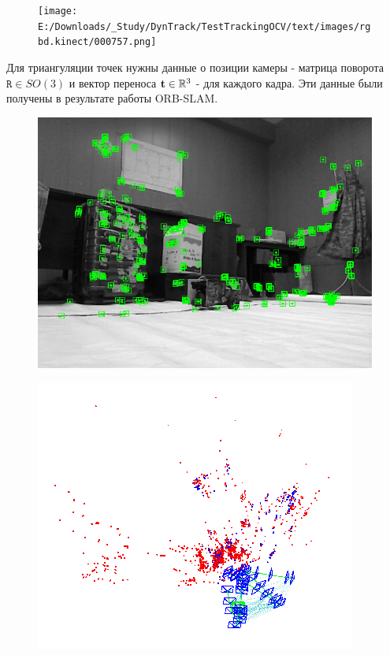 \documentclass[conference]{IEEEtran}
\begin{document}
\begin{figure}[h]
	\centering
		\texttt{[image: E:/Downloads/\_Study/DynTrack/TestTrackingOCV/text/images/rgbd.kinect/000757.png]}
	\label{fig:000757}
\end{figure}


Для триангуляции точек нужны данные о позиции камеры - матрица поворота $\mathtt{R} \in SO(3)$ и вектор переноса ${\bf t} \in \mathbb{R}^3$ - для каждого кадра. Эти данные были получены в результате работы ORB-SLAM.
\begin{figure}[h]
	\centering
		\includegraphics[keepaspectratio,width=\columnwidth]{images/orb-slam/frame1.png}
	\label{fig:000757}
\end{figure}
\begin{figure}[h]
	\centering
		\includegraphics[keepaspectratio,width=\columnwidth]{images/orb-slam/map1.png}
	\label{fig:000757}
\end{figure}
\end{document}
